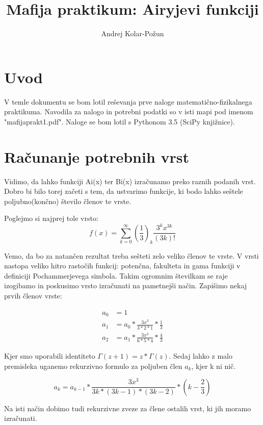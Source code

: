 \documentclass{article}
\title{Mafija praktikum: Airyjevi funkciji}
\author{Andrej Kolar-Po{\v z}un}
\begin{document}
\maketitle
\newpage
{}

\section{Uvod}
V temle dokumentu se bom lotil reševanja prve naloge matematično-fizikalnega praktikuma. Navodila za nalogo in potrebni podatki so v isti mapi pod imenom
"mafijaprakt1.pdf".
Naloge se bom lotil s Pythonom 3.5 (SciPy knjižnice).

\section{Računanje potrebnih vrst}

Vidimo, da lahko funkciji Ai(x) ter Bi(x) izračunamo preko raznih podanih vrst. Dobro bi bilo torej začeti s tem, da
ustvarimo funkcije, ki bodo lahko seštele poljubno(končno) število členov te vrste.

Poglejmo si najprej tole vrsto:
\begin{equation*}
f(x) = \sum_{k=0}^{\infty} \left(\frac{1}{3}\right)_k \frac{3^k x^{3k}}{(3k)!}
\end{equation*}

Vemo, da bo za natančen rezultat treba sešteti zelo veliko členov te vrste. V vrsti nastopa veliko hitro rastočih funkcij: potenčna, 
fakulteta in gama funkciji v definiciji Pochammerjevega simbola. 
Takim ogromnim številkam se raje izogibamo in poskusimo vrsto izračunati na pametnejši način. Zapišimo nekaj prvih členov vrste:


\begin{align*}
a_0 &= 1 \\
a_1 &= a_0 * \frac{3x^3}{3*2*1}*\frac{1}{3} \\
a_2 & = a_1 * \frac{3x^3}{6*5*4}*\frac{4}{3}
\end{align*}

Kjer smo uporabili identiteto $\Gamma(z+1) = z*\Gamma(z)$.
Sedaj lahko z malo premisleka uganemo rekurzivno formulo za poljuben člen $a_k$, kjer k ni nič.

\begin{equation*}
a_k = a_{k-1} * \frac{3x^3}{3k*(3k-1)*(3k-2)}*(k-\frac{2}{3})
\end{equation*}

Na isti način dobimo tudi rekurzivne zveze za člene ostalih vrst, ki jih moramo izračunati.
\end{document}
